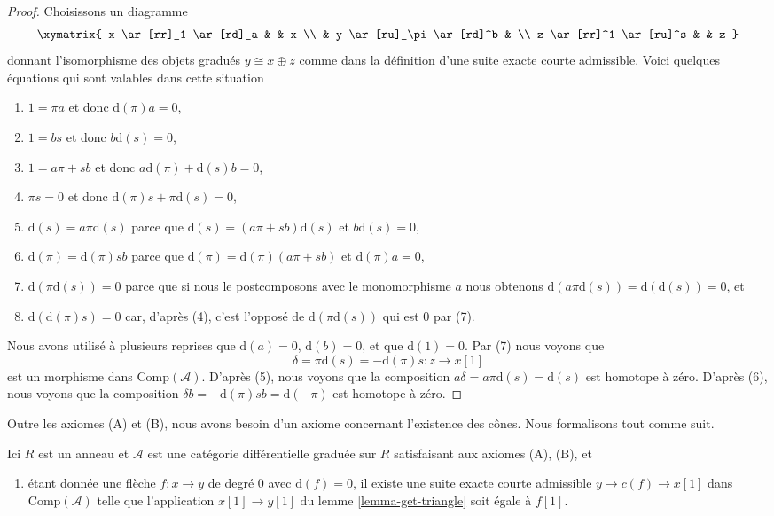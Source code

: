 \begin{proof}
Choisissons un diagramme
$$
\xymatrix{
x \ar[rr]_1 \ar[rd]_a & & x \\
& y \ar[ru]_\pi \ar[rd]^b & \\ z
\ar[rr]^1 \ar[ru]^s & & z
}
$$
donnant l'isomorphisme des objets gradués $y \cong x \oplus z$ comme dans la
définition d'une suite exacte courte admissible. Voici quelques équations qui sont
valables dans cette situation
\begin{enumerate}
\item $1 = \pi a$ et donc $\text{d}(\pi) a = 0$,
\item $1 = b s$ et donc $b \text{d}(s) = 0$,
\item $1 = a \pi + s b$ et donc $a \text{d}(\pi) + \text{d}(s) b = 0$,
\item $\pi s = 0$ et donc $\text{d}(\pi)s + \pi \text{d}(s) = 0$,
\item $\text{d}(s) = a \pi \text{d}(s)$ parce
que $\text{d}(s) = (a \pi + s b)\text{d}(s)$ et $b\text{d}(s) = 0$,
\item $\text{d}(\pi) = \text{d}(\pi) s b$ parce
que $\text{d}(\pi) = \text{d}(\pi)(a \pi + s b)$ et $\text{d}(\pi)a = 0$,
\item $\text{d}(\pi \text{d}(s)) = 0$ parce que si nous le
postcomposons avec le monomorphisme $a$ nous
obtenons $\text{d}(a\pi \text{d}(s)) = \text{d}(\text{d}(s)) = 0$, et
\item $\text{d}(\text{d}(\pi)s) = 0$ car, d'après (4), c'est
l'opposé de $\text{d}(\pi\text{d}(s))$ qui est $0$ par (7).
\end{enumerate}
Nous avons utilisé à plusieurs reprises que $\text{d}(a) = 0$, $\text{d}(b)
= 0$, et que $\text{d}(1) = 0$. Par (7) nous voyons que
$$
\delta = \pi \text{d}(s) = - \text{d}(\pi) s : z \to x[1]
$$
est un morphisme dans $\text{Comp}(\mathcal{A})$. D'après (5), nous
voyons que la composition $a \delta = a \pi \text{d}(s) =
\text{d}(s)$ est homotope à zéro. D'après (6), nous voyons que la
composition $\delta b = - \text{d}(\pi)sb = \text{d}(-\pi)$ est homotope à zéro.
\end{proof}

\noindent
Outre les axiomes (A) et (B), nous avons besoin d'un axiome concernant
l'existence des cônes. Nous formalisons tout comme suit.

\begin{situation}
\label{situation-ABC}
Ici $R$ est un anneau et $\mathcal{A}$ est une catégorie différentielle graduée
sur $R$ satisfaisant aux axiomes (A), (B), et
\begin{enumerate}
\item[(C)] étant donnée une flèche $f : x \to y$ de degré $0$
avec $\text{d}(f) = 0$, il existe une suite exacte courte admissible
$y \to c(f) \to x[1]$ dans $\text{Comp}(\mathcal{A})$ telle que
l'application $x[1] \to y[1]$ du lemme \ref{lemma-get-triangle} soit égale à $f[1]$.
\end{enumerate}
\end{situation}

